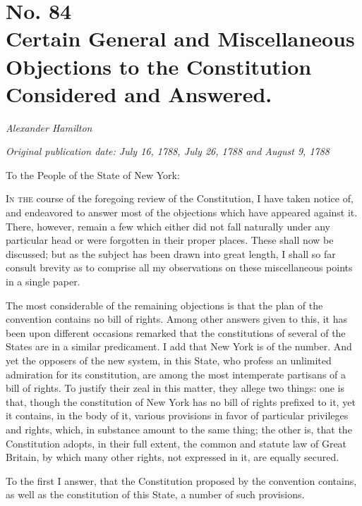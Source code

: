 \chapter[No. 84: Certain General and Miscellaneous Objections to the Constitution Considered and Answered.]{No. 84\\ {\small Certain General and Miscellaneous Objections to the Constitution Considered and Answered.}}

\textit{Alexander Hamilton}

\textit{Original publication date: July 16, 1788, July 26, 1788 and August 9, 1788}
\vspace{1cm}

To the People of the State of New York:
\vspace{.4cm}

\textsc{In the} course of the foregoing review of the Constitution, I have taken notice of, and endeavored to answer most of the objections which have appeared against it. 
There, however, remain a few which either did not fall naturally under any particular head or were forgotten in their proper places. 
These shall now be discussed; but as the subject has been drawn into great length, I shall so far consult brevity as to comprise all my observations on these miscellaneous points in a single paper.

The most considerable of the remaining objections is that the plan of the convention contains no bill of rights. 
Among other answers given to this, it has been upon different occasions remarked that the constitutions of several of the States are in a similar predicament. 
I add that New York is of the number. 
And yet the opposers of the new system, in this State, who profess an unlimited admiration for its constitution, are among the most intemperate partisans of a bill of rights. 
To justify their zeal in this matter, they allege two things: one is that, though the constitution of New York has no bill of rights prefixed to it, yet it contains, in the body of it, various provisions in favor of particular privileges and rights, which, in substance amount to the same thing; the other is, that the Constitution adopts, in their full extent, the common and statute law of Great Britain, by which many other rights, not expressed in it, are equally secured.

To the first I answer, that the Constitution proposed by the convention contains, as well as the constitution of this State, a number of such provisions.

